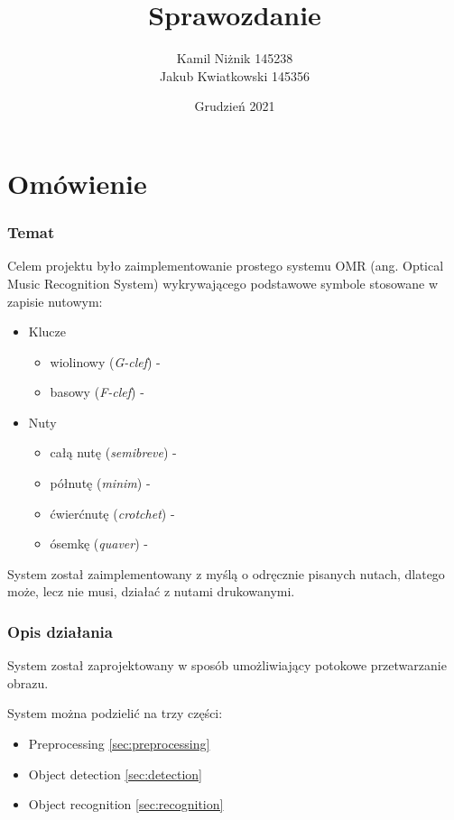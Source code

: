 \documentclass[12pt, letterpaper]{article}
\title{Sprawozdanie}
\author{
    Kamil Niżnik 145238 \\
    Jakub Kwiatkowski 145356
}
\date{Grudzień 2021}
\begin{document}
\newlength{\imagewidth}
\setlength{\imagewidth}{0.8\textwidth}

\maketitle

\part*{Omówienie}

\section{Temat}

Celem projektu było zaimplementowanie prostego systemu OMR
(ang. Optical Music Recognition System) wykrywającego podstawowe
symbole stosowane w zapisie nutowym:
\begin{itemize}
    \item Klucze
          \begin{itemize}
              \item wiolinowy (\textit{G-clef}) - \clefG
              \item basowy (\textit{F-clef}) - \clefF
          \end{itemize}

    \item Nuty
          \begin{itemize}
              \item całą nutę (\textit{semibreve}) - \semibreve
              \item półnutę (\textit{minim}) - \minim
              \item ćwierćnutę (\textit{crotchet}) - \crotchet
              \item ósemkę (\textit{quaver}) - \quaver
          \end{itemize}
\end{itemize}

System został zaimplementowany z myślą o odręcznie pisanych nutach,
dlatego może, lecz nie musi, działać z nutami drukowanymi.


\section{Opis działania}

System został zaprojektowany w sposób umożliwiający potokowe przetwarzanie obrazu.


System można podzielić na trzy części:
\begin{itemize}
    \item Preprocessing \ref{sec:preprocessing}
    \item Object detection \ref{sec:detection}
    \item Object recognition \ref{sec:recognition}
\end{itemize}
\end{document}
